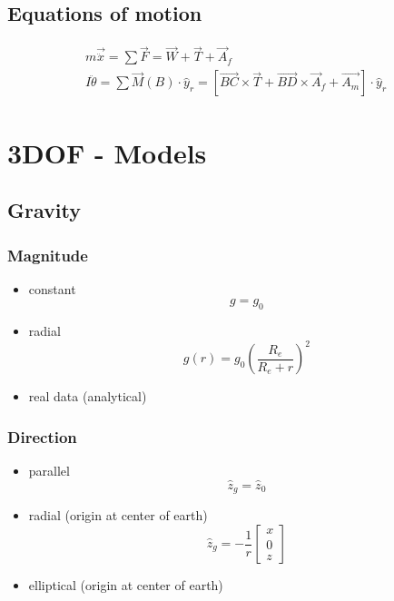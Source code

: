 \documentclass[10pt]{extarticle}
\numberwithin{equation}{subsection}
\begin{document}
\subsection{Equations of motion}
\begin{gather}
    m\vec{\ddot{x}} = \sum \vec{F} = \vec{W} + \vec{T} + \vec{A}_f \\
    I\ddot{\theta} = \sum \vec{M}(B) \cdot \hat{y}_r = \left[\vec{BC}\times\vec{T} + \vec{BD}\times\vec{A}_f + \vec{A_m}\right]\cdot \hat{y}_r
\end{gather}

\newpage
\section{3DOF - Models}
\subsection{Gravity}
\subsubsection{Magnitude}
\begin{itemize}
    \item constant
    \begin{equation}
        g = g_0
    \end{equation}
    \item radial
    \begin{equation}
        g(r) = g_0 {\left(\frac{R_e}{R_e+r}\right)}^2
    \end{equation}
    \item real data (analytical)
\end{itemize}

\subsubsection{Direction}
\begin{itemize}
    \item parallel
    \begin{equation}
        \hat{z}_g = \hat{z}_0
    \end{equation}
    \item radial (origin at center of earth)
    \begin{equation}
        \hat{z}_g = -\frac{1}{r}\begin{bmatrix}
            x \\ 0 \\ z
        \end{bmatrix}
    \end{equation}
    \item elliptical (origin at center of earth)
\end{itemize}
\end{document}
